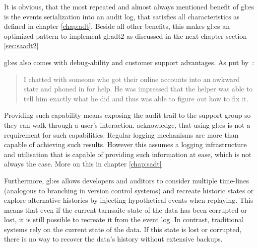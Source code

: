 It is obvious, that the most repeated and almost always mentioned benefit of \gls{gl:es} is the events serialization into an audit log, that satisfies all characteristics as defined in chapter \ref{chap:adt}. Beside all other benefits, this makes \gls{gl:es} an optimized pattern to implement \gls{gl:adt2} as discussed in the next chapter section \ref{sec:saadt2}

\gls{gl:es} also comes with debug-ability and customer support advantages. As put by~\citep{fowleres}:

\begin{quote}
  I chatted with someone who got their online accounts into an awkward state and phoned in for help. He was impressed that the helper was able to tell him exactly what he did and thus was able to figure out how to fix it.
\end{quote}

Providing such capability means exposing the audit trail to the support group so they can walk through a user's interaction. \citep{fowleres} acknowledge, that using \gls{gl:es} is not a requirement for such capabilities. Regular logging mechanisms are more than capable of achieving such results. However this assumes a logging infrastructure and utilisation that is capable of providing such information at ease, which is not always the case. More on this in chapter \ref{chap:sadt}

Furthermore, \gls{gl:es} allows developers and auditors to consider multiple time-lines (analogous to branching in version control systems) and recreate historic states or explore alternative histories by injecting hypothetical events when replaying. This means that even if the current tarnsaite state of the data has been corrupted or lost, it is still possible to recreate it from the event log. In contrast, traditional systems rely on the current state of the data. If this state is lost or corrupted, there is no way to recover the data's history without extensive backups.


